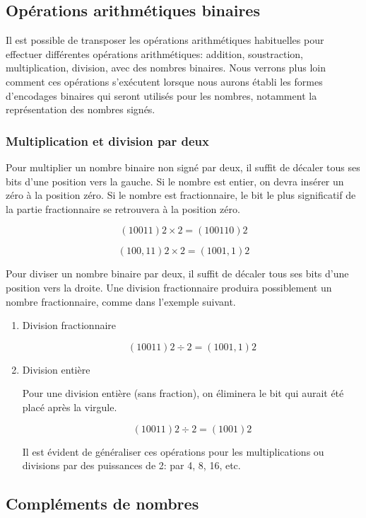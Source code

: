 \documentclass[11pt]{article}
\begin{document}
\subsection{Opérations arithmétiques binaires}
\label{sec:org2b8bc89}

Il est possible de transposer les opérations arithmétiques habituelles
pour effectuer différentes opérations arithmétiques: addition,
soustraction, multiplication, division, avec des nombres
binaires. Nous verrons plus loin comment ces opérations s'exécutent
lorsque nous aurons établi les formes d'encodages binaires qui seront
utilisés pour les nombres, notamment la représentation des nombres
signés.

\subsubsection{Multiplication et division par deux}
\label{sec:org8f5a658}

Pour multiplier un nombre binaire non signé par deux, il suffit de
décaler tous ses bits d'une position vers la gauche. Si le nombre est
entier, on devra insérer un zéro à la position zéro. Si le nombre est
fractionnaire, le bit le plus significatif de la partie fractionnaire se
retrouvera à la position zéro.

$$ (10011)2 \times 2 = (100110)2 $$

$$ (100,11)2 \times 2 = (1001,1)2 $$

Pour diviser un nombre binaire par deux, il suffit de décaler tous ses
bits d'une position vers la droite. Une division fractionnaire
produira possiblement un nombre fractionnaire, comme dans l'exemple
suivant.

\begin{enumerate}
\item Division fractionnaire
\label{sec:org0ba31ff}

$$ (10011)2 \div 2 = (1001,1)2 $$

\item Division entière
\label{sec:org379f8e6}

Pour une division entière (sans fraction), on éliminera le bit qui
aurait été placé après la virgule.

$$ (10011)2 \div 2 = (1001)2 $$

Il est évident de généraliser ces opérations pour les multiplications
ou divisions par des puissances de 2: par 4, 8, 16, etc.
\end{enumerate}

\subsection{Compléments de nombres}
\label{sec:orga2cee15}
\end{document}
